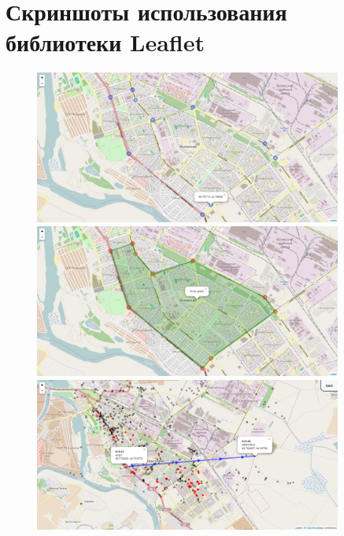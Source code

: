 \documentclass[a4paper, 14pt]{extreport}
\begin{document}
    \chapter{Скриншоты использования библиотеки Leaflet}
    \begin{figure}[ht!]
        \center
        \includegraphics[width=0.9\textwidth]{e1}\\[1ex]
        \includegraphics[width=0.9\textwidth]{e2}\\[1ex]
        \includegraphics[width=0.9\textwidth]{e3}
    \end{figure}

    \newpage
\end{document}
